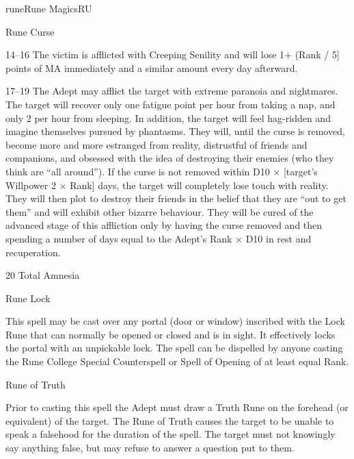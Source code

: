 \begin{College}[2.2]{rune}{Rune Magics}{RU}
\begin{spell}[S-6]{Rune Curse}
\begin{effects}
\begin{Description}
\item[14--16] The victim is afflicted with Creeping Senility and will
  lose 1+ (Rank / 5] points of MA immediately and a similar amount
    every day afterward.

\item[17--19] The Adept may afflict the target with extreme paranoia
  and nightmares.  The target will recover only one fatigue point per
  hour from taking a nap, and only 2 per hour from sleeping. In
  addition, the target will feel hag-ridden and imagine themselves
  pursued by phantasms. They will, until the curse is removed, become
  more and more estranged from reality, distrustful of friends and
  companions, and obsessed with the idea of destroying their enemies
  (who they think are “all around”). If the curse is not removed
  within D10 × [target’s Willpower 2 × Rank] days, the target will
  completely lose touch with reality.  They will then plot to destroy
  their friends in the belief that they are “out to get them” and will
  exhibit other bizarre behaviour.  They will be cured of the advanced
  stage of this affliction only by having the curse removed and then
  spending a number of days equal to the Adept’s Rank × D10 in rest
  and recuperation.

\item[20] Total Amnesia 
\end{Description}
\end{effects}
\end{spell}

\begin{spell}[S-7]{Rune Lock}

\begin{effects}
This spell may be cast over any portal (door or window) inscribed with
the Lock Rune that can normally be opened or closed and is in sight.
It effectively locks the portal with an unpickable lock.  The spell
can be dispelled by anyone casting the Rune College Special
Counterspell or Spell of Opening of at least equal Rank.
\end{effects}
\end{spell}

\begin{spell}[S-8]{Rune of Truth}

\begin{effects}
Prior to casting this spell the Adept must draw a Truth Rune on the
forehead (or equivalent) of the target.  The Rune of Truth causes the
target to be unable to speak a falsehood for the duration of the
spell.  The target must not knowingly say anything false, but may
refuse to answer a question put to them.


\end{effects}
\end{spell}
\end{College}
